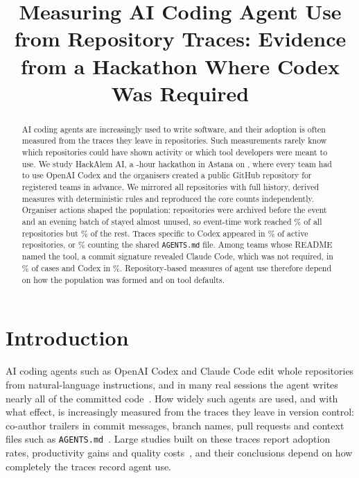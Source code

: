 \documentclass{article}
\title{Measuring AI Coding Agent Use from Repository Traces: Evidence from a Hackathon Where Codex Was Required}
\date{\versiondate}
\author{\authorblock}
\begin{document}
\maketitle

\begin{abstract}
AI coding agents are increasingly used to write software, and their adoption is often measured from the traces they leave in repositories. Such measurements rarely know which repositories could have shown activity or which tool developers were meant to use. We study HackAlem AI, a \eventhours-hour hackathon in Astana on \eventdate, where every team had to use OpenAI Codex and the organisers created a public GitHub repository for registered teams in advance. We mirrored all \NRqOneTotal{} repositories with full history, derived measures with deterministic rules and reproduced the core counts independently. Organiser actions shaped the population: \NRqOnePrearchivedN{} repositories were archived before the event and an evening batch of \NRqOneBatchN{} stayed almost unused, so event-time work reached \NRqOneActivePct\% of all repositories but \NRqOneActiveOfOpenNonbatchPct\% of the rest. Traces specific to Codex appeared in \NRqTwoTracesCodexSpecificPct\% of active repositories, or \NRqTwoTracesCodexAnyPct\% counting the shared \texttt{AGENTS.md} file. Among teams whose README named the tool, a commit signature revealed Claude Code, which was not required, in \NRqTwoTracesSelfReportClaudeStrictSignatureGivenMentionPct\% of cases and Codex in \NRqTwoTracesSelfReportCodexStrictSignatureGivenMentionPct\%. Repository-based measures of agent use therefore depend on how the population was formed and on tool defaults.
\end{abstract}

\section{Introduction}\label{sec:intro}

AI coding agents such as OpenAI Codex and Claude Code edit whole repositories from natural-language instructions, and in many real sessions the agent writes nearly all of the committed code~\cite{baumann2026swechat}. How widely such agents are used, and with what effect, is increasingly measured from the traces they leave in version control: co-author trailers in commit messages, branch names, pull requests and context files such as \texttt{AGENTS.md}~\cite{li2025aidev,robbes2026agenticmuch,robbes2026heuristics,chatlatanagulchai2025agentreadmes}. Large studies built on these traces report adoption rates, productivity gains and quality costs~\cite{robbes2026agenticmuch,agarwal2026aiides,he2026cursor}, and their conclusions depend on how completely the traces record agent use.
\end{document}

